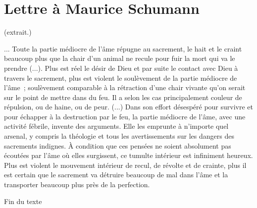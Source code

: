 \documentclass[french,twoside]{book} %
\newif\ifdev
\renewcommand{\LettrineFontHook}{\color{rubric}}
\newcommand{\initialiv}[2]{%
  \let\oldLFH\LettrineFontHook
  \IfSubStr{QJ’}{#1}{
    \lettrine[lines=4, lhang=0.2, loversize=-0.1, lraise=0.2]{\smash{#1}}{#2}
  }{\IfSubStr{É}{#1}{
    \lettrine[lines=4, lhang=0.2, loversize=-0, lraise=0]{\smash{#1}}{#2}
  }{\IfSubStr{ÀÂ}{#1}{
    \lettrine[lines=4, lhang=0.2, loversize=-0, lraise=0, slope=0.6em]{\smash{#1}}{#2}
  }{\IfSubStr{A}{#1}{
    \lettrine[lines=4, lhang=0.2, loversize=0.2, slope=0.6em]{\smash{#1}}{#2}
  }{\IfSubStr{V}{#1}{
    \lettrine[lines=4, lhang=0.2, loversize=0.2, slope=-0.5em]{\smash{#1}}{#2}
  }{
    \lettrine[lines=4, lhang=0.2, loversize=0.2]{\smash{#1}}{#2}
  }}}}}
  \let\LettrineFontHook\oldLFH
}
\newcommand\chapteropen{} %
\newcommand\chaptercont{} %
\newcommand\chapterclose{} %
\renewcommand{\LettrineFontHook}{\bfseries\color{rubric}}
\begin{document}
\begin{center}
\end{center}
\chapterclose


\chapteropen
\chapter[Lettre à Maurice Schumann]{Lettre à Maurice Schumann}

\chaptercont

\begin{center}
(extrait.)\end{center}
\noindent ... Toute la partie médiocre de l'âme répugne au sacrement, le hait et le craint beaucoup plus que la chair d'un animal ne recule pour fuir la mort qui va le prendre (...). Plus est réel le désir de Dieu et par suite le contact avec Dieu à travers le sacrement, plus est violent le soulèvement de la partie médiocre de l'âme ; soulèvement comparable à la rétraction d'une chair vivante qu'on serait sur le point de mettre dans du feu. Il a selon les cas principalement couleur de répulsion, ou de haine, ou de peur. (...) Dans son effort désespéré pour survivre et pour échapper à la destruction par le feu, la partie médiocre de l'âme, avec une activité fébrile, invente des arguments. Elle les emprunte à n'importe quel arsenal, y compris la théologie et tous les avertissements sur les dangers des sacrements indignes. À condition que ces pensées ne soient absolument pas écoutées par l'âme où elles surgissent, ce tumulte intérieur est infiniment heureux. Plus est violent le mouvement intérieur de recul, de révolte et de crainte, plus il est certain que le sacrement va détruire beaucoup de mal dans l'âme et la transporter beaucoup plus près de la perfection.\par
Fin du texte
\chapterclose

\chapterclose

 


\ifbooklet
  \newpage\null\thispagestyle{empty}\newpage
\fi

\ifdev %
\fontname\font — \textsc{Les règles du jeu}\par
(\hyperref[utopie]{\underline{Lien}})\par
\noindent \initialiv{A}{lors là}\blindtext\par
\noindent \initialiv{À}{ la bonheur des dames}\blindtext\par
\noindent \initialiv{É}{tonnez-le}\blindtext\par
\noindent \initialiv{Q}{ualitativement}\blindtext\par
\noindent \initialiv{V}{aloriser}\blindtext\par
\Blindtext
\phantomsection
\label{utopie}
\Blinddocument
\fi
\end{document}

